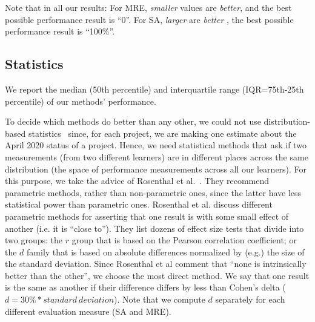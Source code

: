 \documentclass[sigconf,anonymous,review]{acmart}
\newcommand{\bi}{\begin{itemize}}
\newcommand{\ei}{\end{itemize}}
\begin{document}
Note that in all our results: For MRE, {\em smaller}  values are {\em better}, and the best possible performance result is ``0''. For SA,  {\em larger} are {\em better }, the best possible performance result is ``100\%''.


\subsection{Statistics}
\label{sect:stats} 
We report the median (50th percentile) and interquartile range (IQR=75th-25th percentile) of our methods' performance.  


To decide which methods do better than any other,   we could not use distribution-based statistics~\cite{kampenes2007systematic,arcuri2011practical,mittas2012ranking} since, for each project, we are making one estimate about the April 2020 status of a  project.  Hence, we need statistical
methods that ask if two measurements (from two different learners) are in different places
across the same distribution (the space of performance measurements across all our  learners).
For this purpose, we take the advice of  Rosenthal et al.~\cite{rosenthal1994parametric}. They recommend parametric methods, rather than non-parametric ones, since  the latter   have  less statistical power than parametric ones. 
 Rosenthal et al. discuss different parametric methods for asserting that one result is with some small effect of another (i.e. it is ``close to'').
 They list dozens of effect size tests that divide into two groups:    the $r$ group that is based on the Pearson correlation coefficient; or the $d$ family that is based on absolute differences normalized by (e.g.) the size of the standard deviation.   
 Since Rosenthal et al comment that ``none is intrinsically better than the other'', we choose the most direct method. 
 We say that one result is the same as another if their difference  
 differs by less than  Cohen's delta ($\mathit{d=30\%*standard\ deviation}$). 
 Note that we compute $d$ separately for each different evaluation measure  (SA and MRE).
 

\
\end{document}

